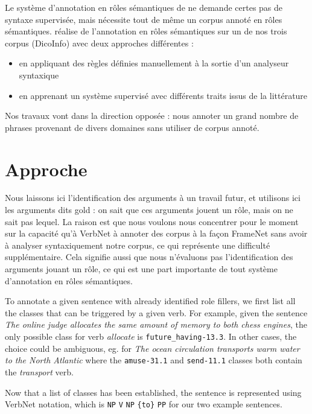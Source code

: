 Le système d'annotation en rôles sémantiques de \cite{gormley2014low} ne
demande certes pas de syntaxe supervisée, mais nécessite tout de même un corpus
annoté en rôles sémantiques. \cite{hadouche2011annotation} réalise de
l'annotation en rôles sémantiques sur un de nos trois corpus (DicoInfo) avec
deux approches différentes :

\begin{itemize}

    \item en appliquant des règles définies manuellement à la sortie d'un
        analyseur syntaxique

    \item en apprenant un système supervisé avec différents traits issus de la
        littérature

\end{itemize}

Nos travaux vont dans la direction opposée : nous annoter un grand nombre de
phrases provenant de divers domaines sans utiliser de corpus annoté.

\section{Approche}

Nous laissons ici l'identification des arguments à un travail futur, et
utilisons ici les arguments dits gold : on sait que ces arguments jouent un
rôle, mais on ne sait pas lequel. La raison est que nous voulons nous
concentrer pour le moment sur la capacité qu'à VerbNet à annoter des corpus à
la façon FrameNet sans avoir à analyser syntaxiquement notre corpus, ce qui
représente une difficulté supplémentaire. Cela signifie aussi que nous
n'évaluons pas l'identification des arguments jouant un rôle, ce qui est une
part importante de tout système d'annotation en rôles sémantiques.

To annotate a given sentence with already identified role fillers, we first
list all the classes that can be triggered by a given verb. For example, given
the sentence \emph{The online judge allocates the same amount of memory to both
chess engines}, the only possible class for verb \emph{allocate} is
\texttt{future\_having-13.3}. In other cases, the choice could be ambiguous,
eg. for \emph{The ocean circulation transports warm water to the North Atlantic}
where the \texttt{amuse-31.1} and \texttt{send-11.1} classes both contain the
\textit{transport} verb.

Now that a list of classes has been established, the sentence is represented
using VerbNet notation, which is \texttt{NP} \texttt{V} \texttt{NP}
\texttt{\{to\}} \texttt{PP} for our two example sentences.

